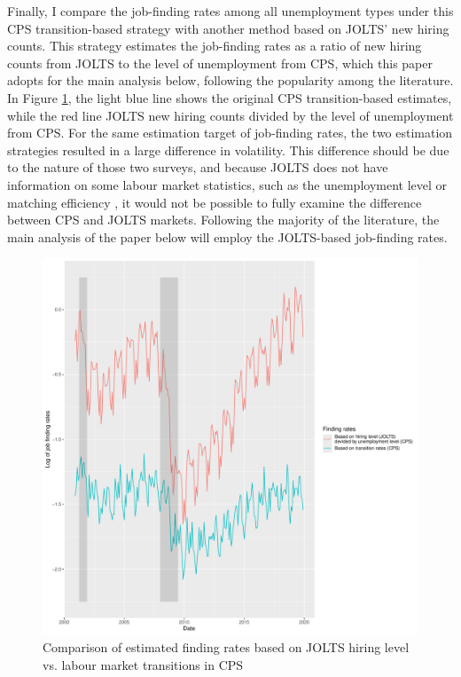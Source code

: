 \documentclass[a4paper, 11pt, tikz]{article}
\begin{document}
Finally, I compare the job-finding rates among all unemployment types under this CPS transition-based strategy with another method based on JOLTS' new hiring counts.
This strategy estimates the job-finding rates as a ratio of new hiring counts from JOLTS to the level of unemployment from CPS, which this paper adopts for the main analysis below, following the popularity among the literature.
In Figure \ref{finding_rates_benchmark}, the light blue line shows the original CPS transition-based estimates, while the red line JOLTS new hiring counts divided by the level of unemployment from CPS.
For the same estimation target of job-finding rates, the two estimation strategies resulted in a large difference in volatility.
This difference should be due to the nature of those two surveys, and because JOLTS does not have information on some labour market statistics, such as the unemployment level or matching efficiency \citep{hall2018measuring}, it would not be possible to fully examine the difference between CPS and JOLTS markets.
Following the majority of the literature, the main analysis of the paper below will employ the JOLTS-based job-finding rates.

\begin{figure}
  \centering
  \includegraphics[width=150mm]{finding_rates_benchmark.pdf}
  \caption{Comparison of estimated finding rates based on JOLTS hiring level vs. labour market transitions in CPS}
  \label{finding_rates_benchmark}
\end{figure}
\end{document}
